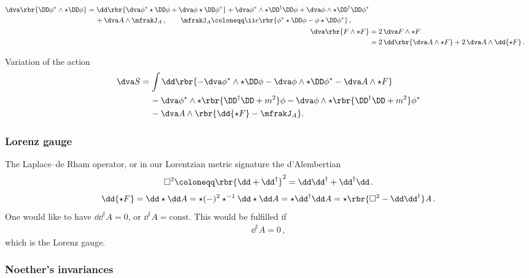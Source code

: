 \documentclass[a4paper]{article}
\begin{document}
\begin{align}
\begin{split}
\dva \rbr{\DD \phi^*\wedge\star\DD\phi} &= 
\dd\rbr{\dva\phi^* \star\DD\phi + \dva\phi \star\DD\phi^*} +
	\dva\phi^*\wedge\star\DD^{\dagger}\DD\phi +
	\dva\phi\wedge\star\DD^{\dagger}\DD\phi^*
\\ &\quad\,+
\dva A \wedge \mfrakJ_A \,,
\qquad
\mfrakJ_A \coloneqq 
	\ii e \rbr{\phi^* \star\DD\phi - \phi\star\DD\phi^*}\,,
\end{split}
\\
\dva \rbr{F\wedge\star F} &=
	2\,\dva F \wedge \star F
\\ &=
	2\,\dd\rbr{\dva A \wedge \star F} + 2\,\dva A \wedge \dd {\star F}\,.
\end{align}

Variation of the action
\begin{align}
\dva S &=
\int \dd\rbr{-\dva\phi^*\wedge\star\DD\phi -
\dva\phi\wedge\star\DD\phi^* - \dva A \wedge\star F}
\nonumber \\
&\quad\,-
\dva\phi^*\wedge\star\rbr{\DD^{\dagger}\DD + m^2}\phi -
\dva\phi\wedge\star\rbr{\DD^{\dagger}\DD + m^2}\phi^*
\nonumber \\
&\quad\,-
\dva A\wedge\rbr{\dd{\star F} - \mfrakJ_{A}}.
\end{align}

\subsubsection{Lorenz gauge}
The Laplace--de Rham operator, or in our Lorentzian metric signature the 
d'Alembertian
\begin{align}
\square^2 \coloneqq \rbr{\dd + \dd^{\dagger}}^2 =
	\dd \dd^{\dagger} + \dd^{\dagger} \dd\,.
\end{align}
\begin{align}
\dd{\star F} = \dd\star \dd A = \star (-)^2 \star^{-1}\dd\star\dd A =
	\star \dd^{\dagger} \dd A = \star\rbr{\square^2 - \dd \dd^{\dagger}} A\,.
\end{align}
One would like to have $\dd \dd^{\dagger} A = 0$, or $\dd^{\dagger} A = 
\text{const}$. This would be fulfilled if
\begin{align}
\dd^{\dagger} A = 0\,,
\end{align}
which is the Lorenz gauge\cite{Lorenz1867,Bladel1991a,Bladel1991b}.

\subsubsection{Noether's invariances}
\end{document}
